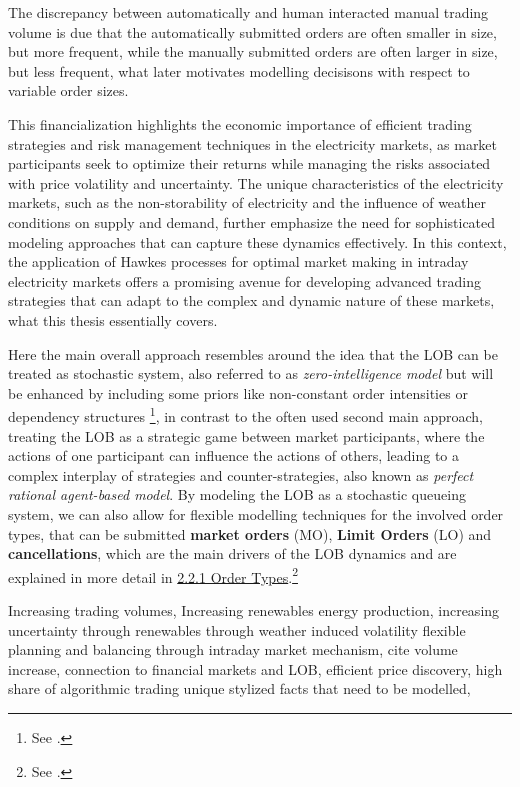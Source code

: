\documentclass[12pt,a4paper]{cau_thesis}
\begin{document}
The discrepancy between automatically and human interacted manual
trading volume is due that the automatically submitted orders are
often smaller in size, but more frequent, while the manually
submitted orders are often larger in size, but less frequent, what
later motivates modelling decisisons with respect to variable order
sizes.

This financialization highlights the economic importance of efficient
trading strategies and risk management techniques in the electricity
markets, as market participants seek to optimize their returns while
managing the risks associated with price volatility and uncertainty.
The unique characteristics of the electricity markets, such as the
non-storability of electricity and the influence of weather
conditions on supply and demand, further emphasize the need for
sophisticated modeling approaches that can capture these dynamics
effectively. In this context, the application of Hawkes processes for
optimal market making in intraday electricity markets offers a
promising avenue for developing advanced trading strategies that can
adapt to the complex and dynamic nature of these markets, what this
thesis essentially covers.

Here the main overall approach resembles around the idea that the LOB
can be treated as stochastic system, also referred to as
\textit{zero-intelligence model} but will be enhanced by including
some priors like non-constant order intensities or dependency
structures \footnote{See \cite{jain2024limit}.}, in contrast to the
often used second main approach, treating the LOB as a strategic game
between market participants, where the actions of one participant can
influence the actions of others, leading to a complex interplay of
strategies and counter-strategies, also known as \textit{perfect
    rational agent-based model}. By modeling the LOB as a stochastic
queueing system, we can also allow for flexible modelling techniques
for the involved order types, that can be submitted \textbf{market
    orders} (MO), \textbf{Limit Orders} (LO) and \textbf{cancellations},
which are the main drivers of the LOB dynamics and are explained in
more detail in \hyperref[sub_sec:order_types]{2.2.1 Order
    Types}.\footnote{See \cite{gould2013limit}.}


Increasing trading volumes, Increasing renewables energy production,
increasing uncertainty through renewables through weather induced
volatility flexible planning and balancing through intraday market
mechanism, cite volume increase, connection to financial markets and
LOB, efficient price discovery, high share of algorithmic trading
unique stylized facts that need to be modelled,
\end{document}
